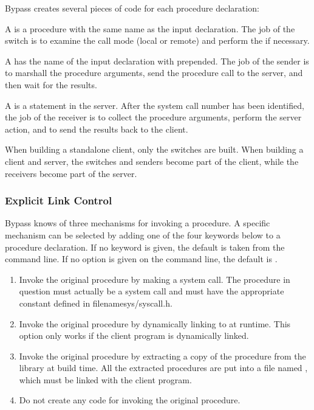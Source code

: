 Bypass creates several pieces of code for each procedure declaration:

A  is a procedure with the same name as the input declaration. The job of the switch is to examine the call mode (local or remote) and perform the  if necessary.

A  has the name of the input declaration with  prepended.  The job of the sender is to marshall the procedure arguments, send the procedure call to the server, and then wait for the results.

A  is a  statement in the server.  After the system call number has been identified, the job of the receiver is to collect the procedure arguments, perform the server action, and to send the results back to the client.

When building a standalone client, only the switches are built.
When building a client and server, the switches and senders become part of the client, while the receivers become part of the server.

\subsubsection{Explicit Link Control}

Bypass knows of three mechanisms for invoking a procedure.  A specific mechanism can be selected by adding one of the four keywords below to a procedure declaration.  If no keyword is given, the default is taken from the command line.  If no option is given on the command line, the default is .

\begin{enumerate}
\item[\Keyword{syscall}] Invoke the original procedure by making a system call.  The procedure in question must actually be a system call and must have the appropriate  constant defined in filename{sys/syscall.h}.
\item[\Keyword{dynamic} \oOpt{"library"} ] Invoke the original procedure by dynamically linking to at runtime.  This option only works if the client program is dynamically linked.
\item[\Keyword{static} \oOpt{"library"}] Invoke the original procedure by extracting a copy of the procedure from the library at build time.  All the extracted procedures are put into a file named , which must be linked with the client program.
\item[\Keyword{plain}] Do not create any code for invoking the original procedure.
\end{enumerate}

